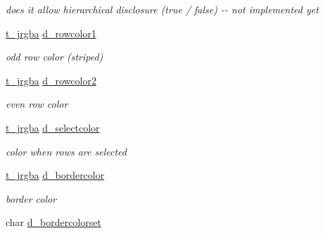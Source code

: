 \begin{DoxyCompactItemize}
\begin{DoxyCompactList}\small\item\em does it allow hierarchical disclosure (true / false) -\/-\/ not implemented yet \item\end{DoxyCompactList}\item 
\hypertarget{structt__jdataview_ab40fcfd41987651067033cd2647a6470}{
\hyperlink{structt__jrgba}{t\_\-jrgba} \hyperlink{structt__jdataview_ab40fcfd41987651067033cd2647a6470}{d\_\-rowcolor1}}
\label{structt__jdataview_ab40fcfd41987651067033cd2647a6470}

\begin{DoxyCompactList}\small\item\em odd row color (striped) \item\end{DoxyCompactList}\item 
\hypertarget{structt__jdataview_ae282d47e47d6ccc4277247e943f87c60}{
\hyperlink{structt__jrgba}{t\_\-jrgba} \hyperlink{structt__jdataview_ae282d47e47d6ccc4277247e943f87c60}{d\_\-rowcolor2}}
\label{structt__jdataview_ae282d47e47d6ccc4277247e943f87c60}

\begin{DoxyCompactList}\small\item\em even row color \item\end{DoxyCompactList}\item 
\hypertarget{structt__jdataview_a23fc2990566b1e92f299008e6f4c543a}{
\hyperlink{structt__jrgba}{t\_\-jrgba} \hyperlink{structt__jdataview_a23fc2990566b1e92f299008e6f4c543a}{d\_\-selectcolor}}
\label{structt__jdataview_a23fc2990566b1e92f299008e6f4c543a}

\begin{DoxyCompactList}\small\item\em color when rows are selected \item\end{DoxyCompactList}\item 
\hypertarget{structt__jdataview_a7353a5808d86388841d014e0e3b71b24}{
\hyperlink{structt__jrgba}{t\_\-jrgba} \hyperlink{structt__jdataview_a7353a5808d86388841d014e0e3b71b24}{d\_\-bordercolor}}
\label{structt__jdataview_a7353a5808d86388841d014e0e3b71b24}

\begin{DoxyCompactList}\small\item\em border color \item\end{DoxyCompactList}\item 
\hypertarget{structt__jdataview_a36e86622d0ea0c0a78db1e5b6f444572}{
char \hyperlink{structt__jdataview_a36e86622d0ea0c0a78db1e5b6f444572}{d\_\-bordercolorset}}
\label{structt__jdataview_a36e86622d0ea0c0a78db1e5b6f444572}


\end{DoxyCompactItemize}
